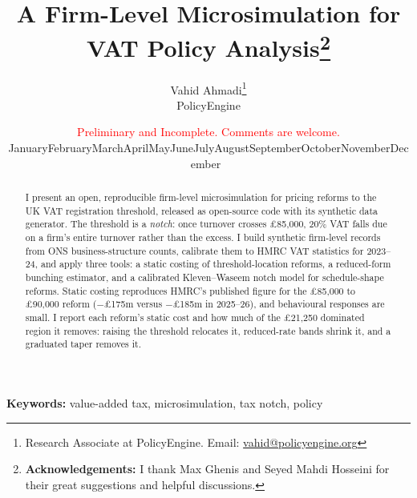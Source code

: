 \documentclass[12pt,letterpaper]{article}
\title{A Firm-Level Microsimulation for VAT Policy Analysis\thanks{\textbf{Acknowledgements:} I thank Max Ghenis and Seyed Mahdi Hosseini for their great suggestions and helpful discussions.}}
\author{Vahid Ahmadi\thanks{Research Associate at PolicyEngine. Email: \href{mailto:vahid@policyengine.org}{vahid@policyengine.org}} \\[0.4cm] \normalsize PolicyEngine}
\date{{\footnotesize\textcolor{red}{Preliminary and Incomplete. Comments are welcome.}} \\ \vspace{0.3cm} \small \ifcase\month\or January\or February\or March\or April\or May\or June\or July\or August\or September\or October\or November\or December\fi\ \the\year}
\begin{document}
\maketitle

\begin{abstract}
I present an open, reproducible firm-level microsimulation for pricing reforms to the UK VAT registration threshold, released as open-source code with its synthetic data generator. The threshold is a \emph{notch}: once turnover crosses \pounds85{,}000, 20\% VAT falls due on a firm's entire turnover rather than the excess. I build synthetic firm-level records from ONS business-structure counts, calibrate them to HMRC VAT statistics for 2023--24, and apply three tools: a static costing of threshold-location reforms, a reduced-form bunching estimator, and a calibrated Kleven--Waseem notch model for schedule-shape reforms. Static costing reproduces HMRC's published figure for the \pounds85{,}000 to \pounds90{,}000 reform ($-$\pounds175m versus $-$\pounds185m in 2025--26), and behavioural responses are small. I report each reform's static cost and how much of the \pounds21{,}250 dominated region it removes: raising the threshold relocates it, reduced-rate bands shrink it, and a graduated taper removes it.
\end{abstract}

\vspace{0.3cm}
\noindent\textbf{Keywords:} value-added tax, microsimulation, tax notch, policy

\newpage





\newpage

{\small }
\end{document}

